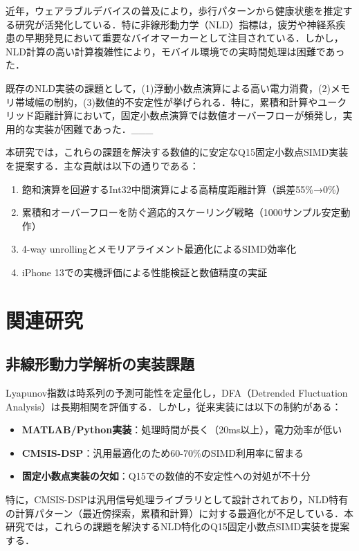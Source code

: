 \documentclass[paper]{ieice}
\begin{document}
近年，ウェアラブルデバイスの普及により，歩行パターンから健康状態を推定する研究が活発化している\cite{hausdorff2009}．特に非線形動力学（NLD）指標は，疲労や神経系疾患の早期発見において重要なバイオマーカーとして注目されている\cite{peng1995}．しかし，NLD計算の高い計算複雑性により，モバイル環境での実時間処理は困難であった．

既存のNLD実装の課題として，(1)浮動小数点演算による高い電力消費，(2)メモリ帯域幅の制約，(3)数値的不安定性が挙げられる．特に，累積和計算やユークリッド距離計算において，固定小数点演算では数値オーバーフローが頻発し，実用的な実装が困難であった．___

本研究では，これらの課題を解決する数値的に安定なQ15固定小数点SIMD実装を提案する．主な貢献は以下の通りである：

\begin{enumerate}
\item 飽和演算を回避するInt32中間演算による高精度距離計算（誤差55\%→0\%）
\item 累積和オーバーフローを防ぐ適応的スケーリング戦略（1000サンプル安定動作）
\item 4-way unrollingとメモリアライメント最適化によるSIMD効率化
\item iPhone 13での実機評価による性能検証と数値精度の実証
\end{enumerate}

\section{関連研究}

\subsection{非線形動力学解析の実装課題}

Lyapunov指数\cite{rosenstein1993}は時系列の予測可能性を定量化し，DFA（Detrended Fluctuation Analysis）\cite{peng1994}は長期相関を評価する．しかし，従来実装には以下の制約がある：

\begin{itemize}
\item \textbf{MATLAB/Python実装}：処理時間が長く（20ms以上），電力効率が低い
\item \textbf{CMSIS-DSP}\cite{arm2020}：汎用最適化のため60-70\%のSIMD利用率に留まる
\item \textbf{固定小数点実装の欠如}：Q15での数値的不安定性への対処が不十分
\end{itemize}

特に，CMSIS-DSPは汎用信号処理ライブラリとして設計されており，NLD特有の計算パターン（最近傍探索，累積和計算）に対する最適化が不足している．本研究では，これらの課題を解決するNLD特化のQ15固定小数点SIMD実装を提案する．
\end{document}
